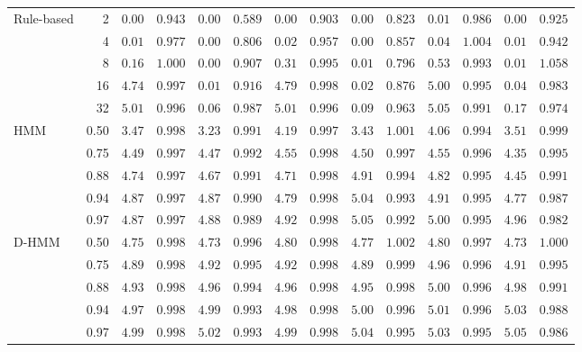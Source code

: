 \begin{tabular}{l r c c c c c c c c c c c c}
 \multirow{5}{*}{Rule-based} & 2 & $0.00$ & $0.943$ & $0.00$ & $0.589$ & $0.00$ & $0.903$ & $0.00$ & $0.823$ & $0.01$ & $0.986$ & $0.00$ & $0.925$\\
 & 4 & $0.01$ & $0.977$ & $0.00$ & $0.806$ & $0.02$ & $0.957$ & $0.00$ & $0.857$ & $0.04$ & $1.004$ & $0.01$ & $0.942$\\
 & 8 & $0.16$ & $1.000$ & $0.00$ & $0.907$ & $0.31$ & $0.995$ & $0.01$ & $0.796$ & $0.53$ & $0.993$ & $0.01$ & $1.058$\\
 & 16 & $4.74$ & $0.997$ & $0.01$ & $0.916$ & $4.79$ & $0.998$ & $0.02$ & $0.876$ & $5.00$ & $0.995$ & $0.04$ & $0.983$\\
 & 32 & $5.01$ & $0.996$ & $0.06$ & $0.987$ & $5.01$ & $0.996$ & $0.09$ & $0.963$ & $5.05$ & $0.991$ & $0.17$ & $0.974$\\
\cmidrule(lr){1-2}
 \multirow{5}{*}{HMM} & 0.50 & $3.47$ & $0.998$ & $3.23$ & $0.991$ & $4.19$ & $0.997$ & $3.43$ & $1.001$ & $4.06$ & $0.994$ & $3.51$ & $0.999$\\
 & 0.75 & $4.49$ & $0.997$ & $4.47$ & $0.992$ & $4.55$ & $0.998$ & $4.50$ & $0.997$ & $4.55$ & $0.996$ & $4.35$ & $0.995$\\
 & 0.88 & $4.74$ & $0.997$ & $4.67$ & $0.991$ & $4.71$ & $0.998$ & $4.91$ & $0.994$ & $4.82$ & $0.995$ & $4.45$ & $0.991$\\
 & 0.94 & $4.87$ & $0.997$ & $4.87$ & $0.990$ & $4.79$ & $0.998$ & $5.04$ & $0.993$ & $4.91$ & $0.995$ & $4.77$ & $0.987$\\
 & 0.97 & $4.87$ & $0.997$ & $4.88$ & $0.989$ & $4.92$ & $0.998$ & $5.05$ & $0.992$ & $5.00$ & $0.995$ & $4.96$ & $0.982$\\
\cmidrule(lr){1-2}
 \multirow{5}{*}{D-HMM} & 0.50 & $4.75$ & $0.998$ & $4.73$ & $0.996$ & $4.80$ & $0.998$ & $4.77$ & $1.002$ & $4.80$ & $0.997$ & $4.73$ & $1.000$\\
 & 0.75 & $4.89$ & $0.998$ & $4.92$ & $0.995$ & $4.92$ & $0.998$ & $4.89$ & $0.999$ & $4.96$ & $0.996$ & $4.91$ & $0.995$\\
 & 0.88 & $4.93$ & $0.998$ & $4.96$ & $0.994$ & $4.96$ & $0.998$ & $4.95$ & $0.998$ & $5.00$ & $0.996$ & $4.98$ & $0.991$\\
 & 0.94 & $4.97$ & $0.998$ & $4.99$ & $0.993$ & $4.98$ & $0.998$ & $5.00$ & $0.996$ & $5.01$ & $0.996$ & $5.03$ & $0.988$\\
 & 0.97 & $4.99$ & $0.998$ & $5.02$ & $0.993$ & $4.99$ & $0.998$ & $5.04$ & $0.995$ & $5.03$ & $0.995$ & $5.05$ & $0.986$\\


\bottomrule
\end{tabular}